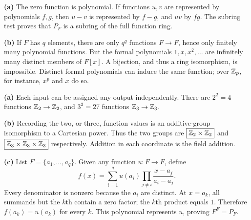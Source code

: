 \textbf{(a)} The zero function is polynomial. If functions $u,v$ are represented by polynomials $f,g$, then $u-v$ is represented by $f-g$, and $uv$ by $fg$. The subring test proves that $P_F$ is a subring of the full function ring.\par
\textbf{(b)} If $F$ has $q$ elements, there are only $q^q$ functions $F\to F$, hence only finitely many polynomial functions. But the formal polynomials $1,x,x^2,\ldots$ are infinitely many distinct members of $F[x]$. A bijection, and thus a ring isomorphism, is impossible. Distinct formal polynomials can induce the same function; over $\mathbb{Z}_p$, for instance, $x^p$ and $x$ do so.

\textbf{(a)} Each input can be assigned any output independently. There are $\boxed{2^2=4}$ functions $\mathbb{Z}_2\to\mathbb{Z}_2$, and $\boxed{3^3=27}$ functions $\mathbb{Z}_3\to\mathbb{Z}_3$.\par
\textbf{(b)} Recording the two, or three, function values is an additive-group isomorphism to a Cartesian power. Thus the two groups are $\boxed{\mathbb{Z}_2\times\mathbb{Z}_2}$ and $\boxed{\mathbb{Z}_3\times\mathbb{Z}_3\times\mathbb{Z}_3}$ respectively. Addition in each coordinate is the field addition.\par
\textbf{(c)} List $F=\{a_1,\ldots,a_q\}$. Given any function $u:F\to F$, define
\[f(x)=\sum_{i=1}^q u(a_i)\prod_{j\ne i}\frac{x-a_j}{a_i-a_j}.
\]
Every denominator is nonzero because the $a_i$ are distinct. At $x=a_k$, all summands but the $k$th contain a zero factor; the $k$th product equals $1$. Therefore $f(a_k)=u(a_k)$ for every $k$. This polynomial represents $u$, proving $F^F=P_F$.
